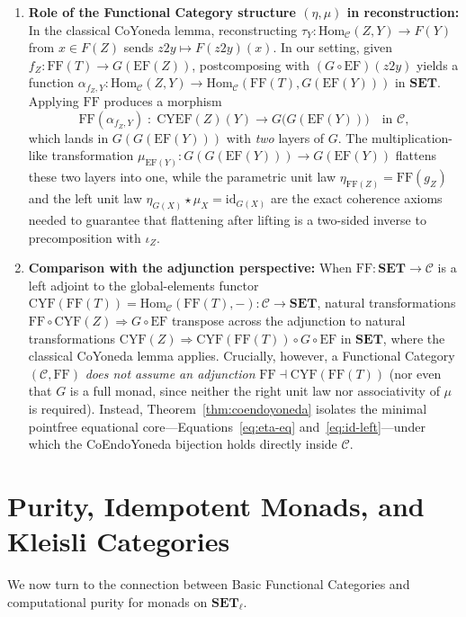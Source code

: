 \documentclass[11pt,a4paper]{article}
\theoremstyle{definition}
\theoremstyle{remark}
\newcommand{\Set}{\mathbf{SET}}
\newcommand{\Hom}{\mathrm{Hom}}
\newcommand{\id}{\mathrm{id}}
\newcommand{\CYF}{\mathrm{CYF}}
\newcommand{\CYEF}{\mathrm{CYEF}}
\newcommand{\FF}{\mathrm{FF}}
\newcommand{\EF}{\mathrm{EF}}
\newcommand{\iotaZ}{\iota_Z}
\begin{document}
\begin{enumerate}[label=(\arabic*),nosep]
  \vspace{3pt}
  \item \textbf{Role of the Functional Category structure $(\eta, \mu)$ in reconstruction:}
  In the classical CoYoneda lemma, reconstructing $\tau_Y : \Hom_{\mathcal{C}}(Z, Y) \to F(Y)$ from
  $x \in F(Z)$ sends $z2y \mapsto F(z2y)(x)$. In our setting, given $f_Z : \FF(T) \to G(\EF(Z))$,
  postcomposing with $(G \circ \EF)(z2y)$ yields a function
  $\alpha_{f_Z, Y} : \Hom_{\mathcal{C}}(Z, Y) \to \Hom_{\mathcal{C}}(\FF(T), G(\EF(Y)))$ in $\Set$.
  Applying $\FF$ produces a morphism
  \[
    \FF(\alpha_{f_Z, Y}) \;:\; \CYEF(Z)(Y) \longrightarrow G\bigl(G(\EF(Y))\bigr)
    \quad\text{in }\mathcal{C},
  \]
  which lands in $G(G(\EF(Y)))$ with \emph{two} layers of $G$. The multiplication-like transformation
  $\mu_{\EF(Y)} : G(G(\EF(Y))) \to G(\EF(Y))$ flattens these two layers into one, while the parametric
  unit law $\eta_{\FF(Z)} = \FF(g_Z)$ and the left unit law $\eta_{G(X)} \star \mu_X = \id_{G(X)}$ are
  the exact coherence axioms needed to guarantee that flattening after lifting is a two-sided inverse to
  precomposition with $\iotaZ$.

  \vspace{3pt}
  \item \textbf{Comparison with the adjunction perspective:}
  When $\FF : \Set \to \mathcal{C}$ is a left adjoint to the global-elements functor
  $\CYF(\FF(T)) = \Hom_{\mathcal{C}}(\FF(T), -) : \mathcal{C} \to \Set$, natural transformations
  $\FF \circ \CYF(Z) \Rightarrow G \circ \EF$ transpose across the adjunction to natural transformations
  $\CYF(Z) \Rightarrow \CYF(\FF(T)) \circ G \circ \EF$ in $\Set$, where the classical CoYoneda lemma
  applies. Crucially, however, a Functional Category $(\mathcal{C}, \FF)$ \emph{does not assume an
  adjunction} $\FF \dashv \CYF(\FF(T))$ (nor even that $G$ is a full monad, since neither the right unit
  law nor associativity of $\mu$ is required). Instead, Theorem~\ref{thm:coendoyoneda} isolates the
  minimal pointfree equational core---Equations~\eqref{eq:eta-eq} and~\eqref{eq:id-left}---under which
  the CoEndoYoneda bijection holds directly inside $\mathcal{C}$.
\end{enumerate}

\section{Purity, Idempotent Monads, and Kleisli Categories}\label{sec:purity}

We now turn to the connection between Basic Functional Categories and computational purity for monads
on $\Set_\ell$.
\end{document}
